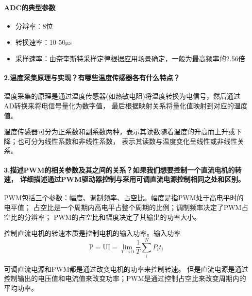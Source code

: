 \documentclass[a4paper]{ctexart}
\begin{document}
    \paragraph{ADC的典型参数}
    \begin{itemize}
      \item 分辨率：8位
      \item 转换速率：10-50$\mathrm{\mu s}$
      \item 采样速率：由奈奎斯特采样定律根据应用场景确定，一般为最高频率的2.56倍
    \end{itemize}

    \paragraph{2.温度采集原理与实现？有哪些温度传感器各有什么特点？\\}
    温度采集的原理是通过温度传感器(如热敏电阻)将温度转换为电信号，然后通过AD转换来将电信号量化为数字值，
    最后根据映射关系将量化值映射到对应的温度值。

    温度传感器可分为正系数和副系数两种，表示其读数随着温度的升高而上升或下降；也可分为线性系数和非线性系数，
    表示其读数与温度变化呈线性或非线性关系。

    \paragraph{3.描述PWM的相关参数及其之间的关系？如果我们想要控制一个直流电机的转速，
    详细描述通过PWM驱动器控制与采用可调直流电源控制相同之处和区别。\\}
    \quad PWM包括三个参数：幅度、调制频率、占空比。幅度是指PWM处于高电平时的电平值；
    占空比是一个周期内高电平占整个周期的比例；调制频率决定了PWM占空比的分辨率；
    PWM的占空比和幅度决定了其输出的功率大小。

    控制直流电机的转速本质是控制电机的输入功率。输入功率
    $$
      \mathrm{P}=\mathrm{UI}
      =\lim_{T \to 0}  \frac{1}{T}\sum_{i}^{N}P_it_i
    $$

    可调直流电源和PWM都是通过改变电机的功率来控制转速。
    但是直流电源是通过控制输出的电压值和电流值来改变功率；PWM是通过控制占空比来改变周期内的平均功率。
\end{document}
